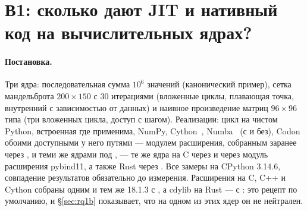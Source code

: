 
\section{В1: сколько дают JIT и нативный код на вычислительных ядрах?}
\label{sec:rq1}


\paragraph{Постановка.} Три ядра: последовательная сумма $10^6$ значений 
(канонический пример), сетка мандельброта $200{\times}150$ с 30 итерациями (вложенные циклы,
плавающая точка, внутренний  с зависимостью от данных) и наивное произведение матриц
$96{\times}96$ типа  (три вложенных цикла, доступ с шагом). Реализации: цикл на
чистом Python, встроенная  где применима, NumPy, Cython~\cite{cython},
Numba~\cite{numba} (с  и без), Codon~\cite{codon} обоими доступными у него
путями --- модулем расширения, собранным заранее через , и теми же
ядрами под , --- те же ядра на C через  и через модуль
расширения pybind11, а также Rust через . Все замеры на CPython 3.14.6, совпадение
результатов обязательно до измерения. Расширения на C, C++ и Cython собраны одним и тем же
 18.1.3 с , а cdylib на Rust --- с :
это рецепт по умолчанию, и \S\ref{sec:rq1b} показывает, что на одном из этих ядер он не нейтрален.

\begin{table}[t]
  \centering
  \caption{В1: вычислительные ядра на CPython 3.14.6, на единственном хосте из
    таблицы~\ref{tab:platform}. Медианное время вызова и ускорение относительно цикла на чистом
    Python. Строка  для NumPy --- это данные о поставляемом BLAS, а не о компиляторе.}
  \label{tab:compute}
  \small
  
\end{table}

